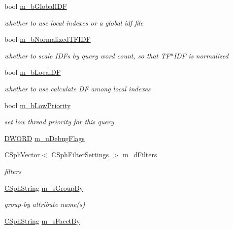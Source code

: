 \begin{DoxyCompactItemize}
bool \hyperlink{classCSphQuery_a2f65d3d6c473175e9ab10d6d54ef3edf}{m\-\_\-b\-Global\-I\-D\-F}
\begin{DoxyCompactList}\small\item\em whether to use local indexes or a global idf file \end{DoxyCompactList}\item 
bool \hyperlink{classCSphQuery_a519eff08a0311ee531b99d232fa4542f}{m\-\_\-b\-Normalized\-T\-F\-I\-D\-F}
\begin{DoxyCompactList}\small\item\em whether to scale I\-D\-Fs by query word count, so that T\-F$\ast$\-I\-D\-F is normalized \end{DoxyCompactList}\item 
bool \hyperlink{classCSphQuery_acb2dafa5753a50ada9e5bb51670e658b}{m\-\_\-b\-Local\-D\-F}
\begin{DoxyCompactList}\small\item\em whether to use calculate D\-F among local indexes \end{DoxyCompactList}\item 
bool \hyperlink{classCSphQuery_af46ec4b566c3cf271e8486caf8d27169}{m\-\_\-b\-Low\-Priority}
\begin{DoxyCompactList}\small\item\em set low thread priority for this query \end{DoxyCompactList}\item 
\hyperlink{sphinxstd_8h_a798af1e30bc65f319c1a246cecf59e39}{D\-W\-O\-R\-D} \hyperlink{classCSphQuery_aacb54cc52df6df9cc9201f375915638b}{m\-\_\-u\-Debug\-Flags}
\item 
\hyperlink{classCSphVector}{C\-Sph\-Vector}$<$ \hyperlink{classCSphFilterSettings}{C\-Sph\-Filter\-Settings} $>$ \hyperlink{classCSphQuery_a890769b9fb74908995e5e5335aee572c}{m\-\_\-d\-Filters}
\begin{DoxyCompactList}\small\item\em filters \end{DoxyCompactList}\item 
\hyperlink{structCSphString}{C\-Sph\-String} \hyperlink{classCSphQuery_a203ace139c1feadd62f726a682527395}{m\-\_\-s\-Group\-By}
\begin{DoxyCompactList}\small\item\em group-\/by attribute name(s) \end{DoxyCompactList}\item 
\hyperlink{structCSphString}{C\-Sph\-String} \hyperlink{classCSphQuery_aaf5e150cf9573eaf96bfd77698def569}{m\-\_\-s\-Facet\-By}

\end{DoxyCompactItemize}
